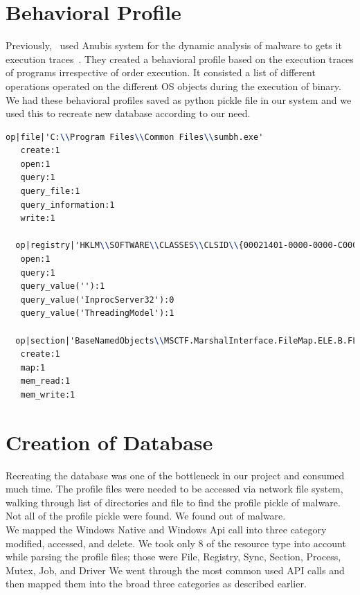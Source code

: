 \section{Behavioral Profile}
\label{sec:behvairoalprofile}
Previously,~\citeauthor{bayer} used Anubis system for the dynamic analysis of malware to gets it execution traces~\cite[]{bayer}.
They created a behavioral profile based on the execution traces of programs irrespective of order execution. It consisted a list of different operations operated on the different OS objects during the execution of binary.
We had these behavioral profiles saved as python pickle file in our system and we used this to recreate new database according to our need.
\begin{lstlisting}[language=TeX,caption={Behvaioral Profile sample}, label={lst:bpsample}]
  op|file|'C:\\Program Files\\Common Files\\sumbh.exe'
   create:1
   open:1
   query:1
   query_file:1
   query_information:1
   write:1

  op|registry|'HKLM\\SOFTWARE\\CLASSES\\CLSID\\{00021401-0000-0000-C000-000000000046}\\INPROCSERVER32'
   open:1
   query:1
   query_value(''):1
   query_value('InprocServer32'):0
   query_value('ThreadingModel'):1

  op|section|'BaseNamedObjects\\MSCTF.MarshalInterface.FileMap.ELE.B.FLKMG'
   create:1
   map:1
   mem_read:1
   mem_write:1
\end{lstlisting}
\section{Creation of Database}
\label{sec:Creation of Database}
Recreating the database was one of the bottleneck in our project and consumed much time.
The profile files were needed to be accessed via network file system, walking through list of directories and file to find the profile pickle of malware.
Not all of the profile pickle were found. We found \emph{\gettotalmalwareii{}} out of \emph{\gettotalmalwarei{}} malware.\\
We mapped the Windows Native and Windows Api call into three category modified, accessed, and delete.
We took only 8 of the resource type into account while parsing the profile files; those were File, Registry, Sync, Section, Process, Mutex, Job, and Driver
We went through the most common used API calls and then mapped them into the broad three categories as described earlier.

